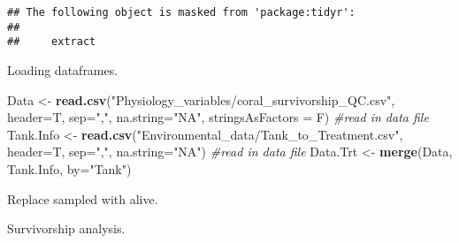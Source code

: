\documentclass[]{article}
\newenvironment{Shaded}{\begin{snugshade}}{\end{snugshade}}
\newcommand{\KeywordTok}[1]{\textcolor[rgb]{0.13,0.29,0.53}{\textbf{#1}}}
\newcommand{\DataTypeTok}[1]{\textcolor[rgb]{0.13,0.29,0.53}{#1}}
\newcommand{\DecValTok}[1]{\textcolor[rgb]{0.00,0.00,0.81}{#1}}
\newcommand{\StringTok}[1]{\textcolor[rgb]{0.31,0.60,0.02}{#1}}
\newcommand{\CommentTok}[1]{\textcolor[rgb]{0.56,0.35,0.01}{\textit{#1}}}
\newcommand{\OperatorTok}[1]{\textcolor[rgb]{0.81,0.36,0.00}{\textbf{#1}}}
\newcommand{\NormalTok}[1]{#1}
\begin{document}
\begin{verbatim}
## The following object is masked from 'package:tidyr':
## 
##     extract
\end{verbatim}

Loading dataframes.

\begin{Shaded}
\begin{Highlighting}[]
\NormalTok{Data <-}\StringTok{ }\KeywordTok{read.csv}\NormalTok{(}\StringTok{"Physiology_variables/coral_survivorship_QC.csv"}\NormalTok{, }\DataTypeTok{header=}\NormalTok{T, }\DataTypeTok{sep=}\StringTok{","}\NormalTok{, }\DataTypeTok{na.string=}\StringTok{"NA"}\NormalTok{, }\DataTypeTok{stringsAsFactors =}\NormalTok{ F) }\CommentTok{#read in data file}
\NormalTok{Tank.Info <-}\StringTok{ }\KeywordTok{read.csv}\NormalTok{(}\StringTok{"Environmental_data/Tank_to_Treatment.csv"}\NormalTok{, }\DataTypeTok{header=}\NormalTok{T, }\DataTypeTok{sep=}\StringTok{","}\NormalTok{, }\DataTypeTok{na.string=}\StringTok{"NA"}\NormalTok{) }\CommentTok{#read in data file }
\NormalTok{Data.Trt <-}\StringTok{ }\KeywordTok{merge}\NormalTok{(Data, Tank.Info, }\DataTypeTok{by=}\StringTok{"Tank"}\NormalTok{)}
\end{Highlighting}
\end{Shaded}

Replace sampled with alive.

\begin{Shaded}
\end{Shaded}

Survivorship analysis.
\end{document}
